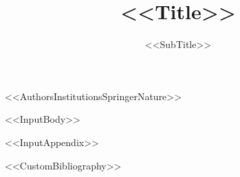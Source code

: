 \documentclass[%
sn-mathphys-num,
<<DocumentClassOptions>>]{sn-jnl}
\begin{document}
\title[<<ShortTitle>>]{<<Title>>}
\subtitle{<<SubTitle>>}

<<AuthorsInstitutionsSpringerNature>>






\maketitle

<<InputBody>>

\begin{appendices}
<<InputAppendix>>
\end{appendices}

<<CustomBibliography>>
\end{document}
